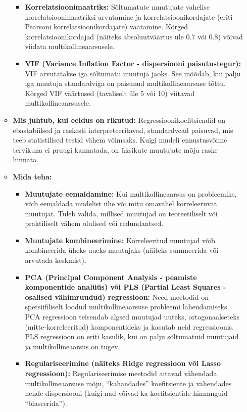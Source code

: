 \documentclass[
]{book}
\providecommand{\tightlist}{%
  \setlength{\itemsep}{0pt}\setlength{\parskip}{0pt}}
\begin{document}
\begin{itemize}
\begin{itemize}
    \begin{itemize}
    \tightlist
    \item
      \textbf{Korrelatsioonimaatriks:} Sõltumatute muutujate vahelise korrelatsioonimaatriksi arvutamine ja korrelatsioonikordajate (eriti Pearsoni korrelatsioonikordajate) vaatamine. Kõrged korrelatsioonikordajad (näiteks absoluutväärtus üle 0.7 või 0.8) võivad viidata multikollineaarsusele.
    \item
      \textbf{VIF (Variance Inflation Factor - dispersiooni paisutustegur):} VIF arvutatakse iga sõltumatu muutuja jaoks. See mõõdab, kui palju iga muutuja standardviga on paisunud multikollineaarsuse tõttu. Kõrged VIF väärtused (tavaliselt üle 5 või 10) viitavad multikollineaarsusele.
    \end{itemize}
  \item
    \textbf{Mis juhtub, kui eeldus on rikutud:} Regressioonikoefitsiendid on ebastabiilsed ja raskesti interpreteeritavad, standardvead paisuvad, mis teeb statistilised testid vähem võimsaks. Kuigi mudeli ennustusvõime tervikuna ei pruugi kannatada, on üksikute muutujate mõju raske hinnata.
  \item
    \textbf{Mida teha:}

    \begin{itemize}
    \tightlist
    \item
      \textbf{Muutujate eemaldamine:} Kui multikollineaarsus on probleemiks, võib eemaldada mudelist ühe või mitu omavahel korreleeruvat muutujat. Tuleb valida, millised muutujad on teoreetiliselt või praktiliselt vähem olulised või redundantsed.
    \item
      \textbf{Muutujate kombineerimine:} Korreleeritud muutujad võib kombineerida üheks uueks muutujaks (näiteks summeerida või arvutada keskmist).
    \item
      \textbf{PCA (Principal Component Analysis - peamiste komponentide analüüs) või PLS (Partial Least Squares - osalised vähimruudud) regressioon:} Need meetodid on spetsiifiliselt loodud multikollineaarsuse probleemi lahendamiseks. PCA regressioon teisendab algsed muutujad uuteks, ortogonaalseteks (mitte-korreleeritud) komponentideks ja kasutab neid regressioonis. PLS regressioon on eriti kasulik, kui on palju sõltumatuid muutujaid ja multikollineaarsus on tugev.
    \item
      \textbf{Regulariseerimine (näiteks Ridge regressioon või Lasso regressioon):} Regulariseerimise meetodid aitavad vähendada multikollineaarsuse mõju, ``kahandades'' koefitsiente ja vähendades nende dispersiooni (kuigi nad võivad ka koefitsientide hinnanguid ``biaseerida'').
    \end{itemize}
  \end{itemize}
\end{itemize}
\end{document}
